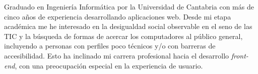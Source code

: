 \documentclass[9pt]{developercv} %
\begin{document}
\begin{minipage}[t]{0.45\textwidth} %
	\vspace{-\baselineskip} %
	
	Graduado en Ingeniería Informática por la Universidad de Cantabria con más de cinco años de experiencia desarrollando aplicaciones web. Desde mi etapa académica me he interesado en la desigualdad social observable en el seno de las TIC y la búsqueda de formas de acercar los computadores al público general, incluyendo a personas con perfiles poco técnicos y/o con barreras de accesibilidad. Esto ha inclinado mi carrera profesional hacia el desarrollo \emph{front-end}, con una preocupación especial en la experiencia de usuario.\\
\end{minipage}
\hfill %
\begin{minipage}[t]{0.5\textwidth} %
	\vspace{-\baselineskip} %
	\begin{barchart}{5.5}
	\end{barchart}
\end{minipage}


%
%

\end{document}

